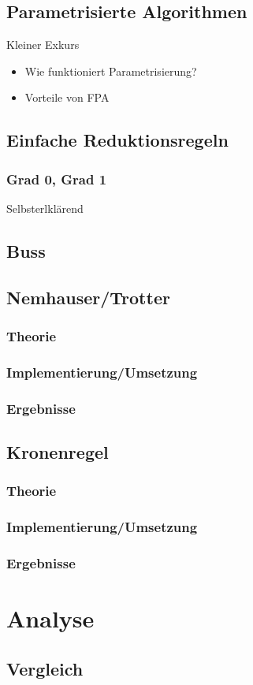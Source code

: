 \documentclass[a4paper]{article}
\begin{document}
\subsection{Parametrisierte Algorithmen}
Kleiner Exkurs
\begin{itemize}
\item Wie funktioniert Parametrisierung?
\item Vorteile von FPA
\end{itemize}
\subsection{Einfache Reduktionsregeln}
\subsubsection{Grad 0, Grad 1}
Selbsterlklärend

\subsection{Buss}

\subsection{Nemhauser/Trotter}

\subsubsection{Theorie}

\subsubsection{Implementierung/Umsetzung}

\subsubsection{Ergebnisse}


\subsection{Kronenregel}

\subsubsection{Theorie}

\subsubsection{Implementierung/Umsetzung}

\subsubsection{Ergebnisse}

\section{Analyse}

\subsection{Vergleich}

\newpage
\printbibliography
\end{document}
